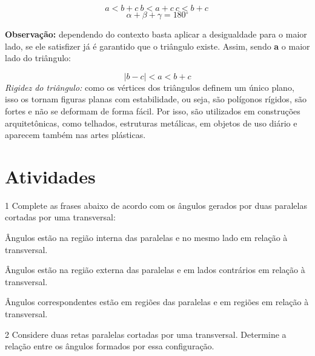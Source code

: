 {$$ a < b + c\ b < a + c\ c < b + c\ $$
$$\alpha + \beta + \gamma = 180{^\circ}$$

\medskip \noindent \textbf{Observação:} dependendo do contexto basta aplicar a desigualdade
para o maior lado, se ele satisfizer já é garantido que o triângulo
existe. Assim, sendo \textbf{{a}} o maior lado do triângulo:

$$\left| b - c \right| < a < b + c$$
\medskip \noindent \textit{Rigidez do triângulo:} como os vértices dos triângulos definem um
único plano, isso os tornam figuras planas com estabilidade, ou seja,
são polígonos rígidos, são fortes e não se deformam de forma fácil. Por
isso, são utilizados em construções arquitetônicas, como telhados,
estruturas metálicas, em objetos de uso diário e aparecem também nas
artes plásticas.}

\section*{Atividades}

\num{1} Complete as frases abaixo de acordo com os ângulos gerados por duas
paralelas cortadas por uma transversal:

\begin{escolha}[itemsep=0pt]
\item Ângulos  estão na região interna das paralelas e no mesmo lado
em relação à transversal.
\item Ângulos  estão na região externa das paralelas e em lados
contrários em relação à transversal.
\item Ângulos correspondentes estão em regiões  das paralelas e em
regiões  em relação à transversal.
\end{escolha}

\num{2} Considere duas retas paralelas cortadas por uma transversal.
Determine a relação entre os ângulos formados por essa configuração.

